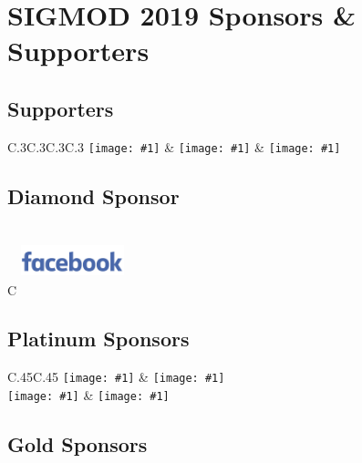 \newcommand{\sponsoricon}[1]{{\texttt{[image: \#1]}}}

\newpage
\section*{SIGMOD 2019 Sponsors \& Supporters}

\subsection*{Supporters}

\begin{tabular}{C{.3\textwidth}C{.3\textwidth}C{.3\textwidth}C{.3\textwidth}}
\sponsoricon{sponsoricons/sigmod}
&
\sponsoricon{sponsoricons/acm}
&
\sponsoricon{sponsoricons/cwi}
\end{tabular}
    
\subsection*{Diamond Sponsor}

\renewcommand{\arraystretch}{1.3}

\begin{tabular}{C{\linewidth}}
\includegraphics[width=3cm,height=2cm,keepaspectratio]{sponsoricons/facebook}
\end{tabular}

\subsection*{Platinum Sponsors}

\begin{tabular}{C{.45\textwidth}C{.45\textwidth}}
\sponsoricon{sponsoricons/elsevier}
&
\sponsoricon{sponsoricons/microsoft}
\\
\sponsoricon{sponsoricons/oracle}
&
\sponsoricon{sponsoricons/tableau}
\end{tabular}


\subsection*{Gold Sponsors}


